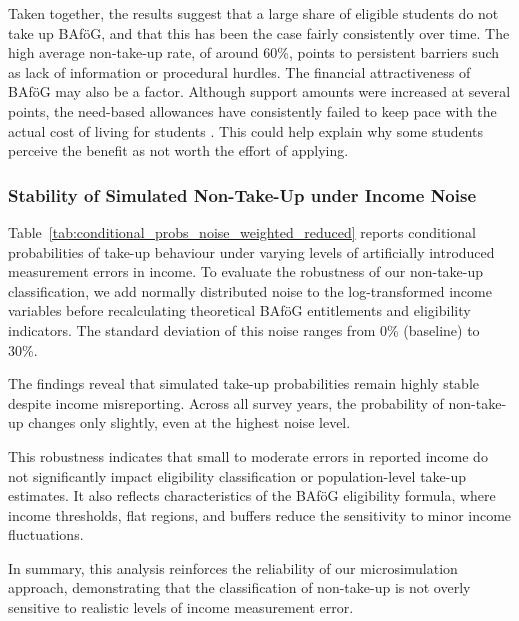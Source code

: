 Taken together, the results suggest that a large share of eligible students do not take up BAföG, and that this has been the case fairly consistently over time. 
The high average non-take-up rate, of around 60\%, points to persistent barriers such as lack of information or procedural hurdles. 
The financial attractiveness of BAföG may also be a factor. 
Although support amounts were increased at several points, the need-based allowances have consistently failed to keep pace with the actual cost of living for students \citep{staack_von_2017}. 
This could help explain why some students perceive the benefit as not worth the effort of applying. 


\subsubsection{Stability of Simulated Non-Take-Up under Income Noise}
Table~\ref{tab:conditional_probs_noise_weighted_reduced} reports conditional probabilities of take-up behaviour under varying levels of artificially introduced measurement errors in income. 
To evaluate the robustness of our non-take-up classification, we add normally distributed noise to the log-transformed income variables before recalculating theoretical BAföG entitlements and eligibility indicators. 
The standard deviation of this noise ranges from 0\% (baseline) to 30\%.



The findings reveal that simulated take-up probabilities remain highly stable despite income misreporting. 
Across all survey years, the probability of non-take-up changes only slightly, even at the highest noise level. 

This robustness indicates that small to moderate errors in reported income do not significantly impact eligibility classification or population-level take-up estimates. 
It also reflects characteristics of the BAföG eligibility formula, where income thresholds, flat regions, and buffers reduce the sensitivity to minor income fluctuations.

In summary, this analysis reinforces the reliability of our microsimulation approach, demonstrating that the classification of non-take-up is not overly sensitive to realistic levels of income measurement error.



